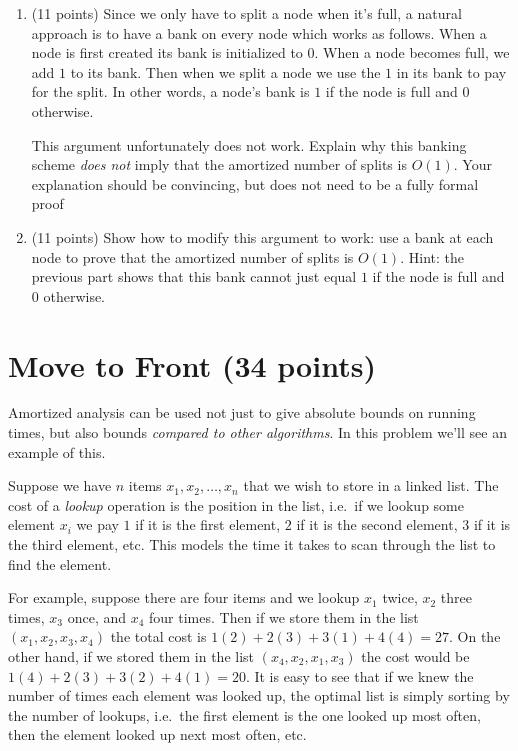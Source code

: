 \documentclass[11pt]{article}
\begin{document}
\begin{enumerate}[resume]
\item (11 points) Since we only have to split a node when it's full, a natural approach is to have a  bank on every node which works as follows.  When a node is first created its bank is initialized to $0$.  When a node becomes full, we add $1$ to its bank.  Then when we split a node we use the $1$ in its bank to pay for the split.  In other words, a node's bank is $1$ if the node is full and $0$ otherwise.

This argument unfortunately does not work.  Explain why this banking scheme \emph{does not} imply that the amortized number of splits is $O(1)$.  Your explanation should be convincing, but does not need to be a fully formal proof

\item (11 points) Show how to modify this argument to work: use a bank at each node to prove that the amortized number of splits is $O(1)$.  Hint: the previous part shows that this bank cannot just equal $1$ if the node is full and $0$ otherwise.


\end{enumerate}

\section{Move to Front (34 points)}
Amortized analysis can be used not just to give absolute bounds on running times, but also bounds \emph{compared to other algorithms}.  In this problem we'll see an example of this.

Suppose we have $n$ items $x_1, x_2, \dots, x_n$ that we wish to store in a linked list.  The cost of a \emph{lookup} operation is the position in the list, i.e.~if we lookup some element $x_i$ we pay $1$ if it is the first element, $2$ if it is the second element, $3$ if it is the third element, etc.  This models the time it takes to scan through the list to find the element.  

For example, suppose there are four items and we lookup $x_1$ twice, $x_2$ three times, $x_3$ once, and $x_4$ four times.  Then if we store them in the list $(x_1, x_2, x_3, x_4)$ the total cost is $1(2) + 2(3) + 3(1) + 4(4) = 27$.  On the other hand, if we stored them in the list $(x_4, x_2, x_1, x_3)$ the cost would be $1(4) + 2(3) + 3(2) + 4(1) = 20$.  It is easy to see that if we knew the number of times each element was looked up, the optimal list is simply sorting by the number of lookups, i.e.~the first element is the one looked up most often, then the element looked up next most often, etc.  
\end{document}
